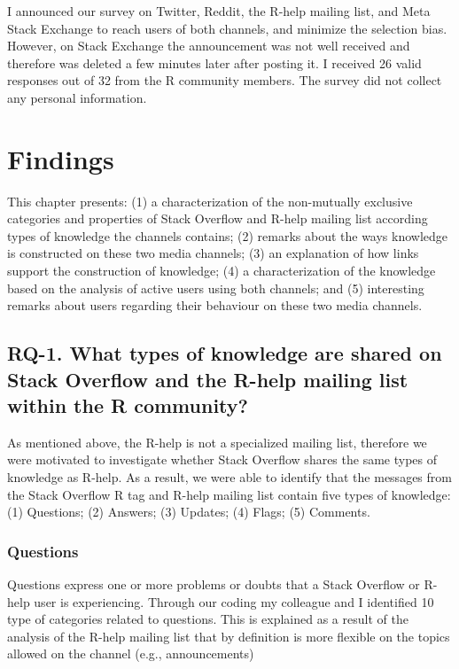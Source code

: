 \documentclass{sig-alternate-05-2015}
\begin{document}
	I announced our survey on Twitter, Reddit, the R-help mailing list, and Meta Stack Exchange to reach users of both channels, and minimize the selection bias. 
	However, on Stack Exchange the announcement was not well received and therefore was deleted a few minutes later after posting it.
	I received 26 valid responses out of 32 from the R community members.
	The survey did not collect any personal information.


\section{Findings}
\label{cha:findings}

	This chapter presents:
	(1) a characterization of the non-mutually exclusive categories and properties of Stack Overflow and R-help mailing list according types of knowledge the channels contains;
	(2) remarks about the ways knowledge is constructed on these two media channels;
	(3) an explanation of how links support the construction of knowledge;
	(4) a characterization of the knowledge based on the analysis of active users using both channels; and
	(5) interesting remarks about users regarding their behaviour on these two media channels.

\subsection{RQ-1. What types of knowledge are shared on Stack Overflow and the R-help mailing list within the R community?}
\label{cha:findings-types}

	As mentioned above, the R-help is not a specialized mailing list, therefore we were motivated to investigate whether Stack Overflow shares the same types of knowledge as R-help.
	As a result, we were able to identify that the messages from the Stack Overflow R tag and R-help mailing list contain five types of knowledge:
	(1) Questions;
	(2) Answers;
	(3) Updates;
	(4) Flags;
	(5) Comments.

\subsubsection*{Questions}

	Questions express one or more problems or doubts that a Stack Overflow or R-help user is experiencing.
	Through our coding my colleague and I identified 10 type of categories related to questions.
	This is explained as a result of the analysis of the R-help mailing list that by definition is more flexible on the topics allowed on the channel (e.g., announcements)
\end{document}
